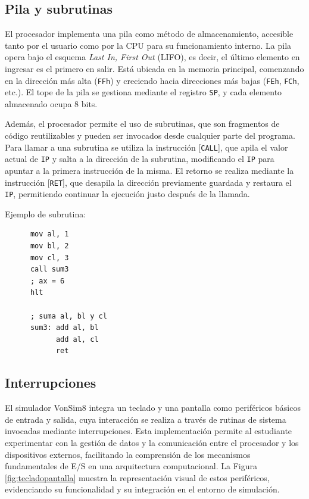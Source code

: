 \documentclass[12pt,oneside]{templates/unerthesis}
\begin{document}
\hypertarget{pila-y-subrutinas}{%
\subsection{Pila y subrutinas}\label{pila-y-subrutinas}}

El procesador implementa una pila como método de almacenamiento, accesible tanto por el usuario como por la CPU para su funcionamiento interno. La pila opera bajo el esquema \emph{Last In, First Out} (LIFO), es decir, el último elemento en ingresar es el primero en salir. Está ubicada en la memoria principal, comenzando en la dirección más alta (\texttt{FFh}) y creciendo hacia direcciones más bajas (\texttt{FEh}, \texttt{FCh}, etc.). El tope de la pila se gestiona mediante el registro \texttt{SP}, y cada elemento almacenado ocupa 8 bits.

Además, el procesador permite el uso de subrutinas, que son fragmentos de código reutilizables y pueden ser invocados desde cualquier parte del programa. Para llamar a una subrutina se utiliza la instrucción {[}\texttt{CALL}{]}, que apila el valor actual de \texttt{IP} y salta a la dirección de la subrutina, modificando el \texttt{IP} para apuntar a la primera instrucción de la misma. El retorno se realiza mediante la instrucción {[}\texttt{RET}{]}, que desapila la dirección previamente guardada y restaura el \texttt{IP}, permitiendo continuar la ejecución justo después de la llamada.

Ejemplo de subrutina:

\begin{lstlisting}
      mov al, 1
      mov bl, 2
      mov cl, 3
      call sum3
      ; ax = 6
      hlt

      ; suma al, bl y cl
      sum3: add al, bl
            add al, cl
            ret\end{lstlisting}

\hypertarget{interrupciones}{%
\subsection{Interrupciones}\label{interrupciones}}

El simulador VonSim8 integra un teclado y una pantalla como periféricos básicos de entrada y salida, cuya interacción se realiza a través de rutinas de sistema invocadas mediante interrupciones. Esta implementación permite al estudiante experimentar con la gestión de datos y la comunicación entre el procesador y los dispositivos externos, facilitando la comprensión de los mecanismos fundamentales de E/S en una arquitectura computacional. La Figura \ref{fig:tecladopantalla} muestra la representación visual de estos periféricos, evidenciando su funcionalidad y su integración en el entorno de simulación.
\end{document}
